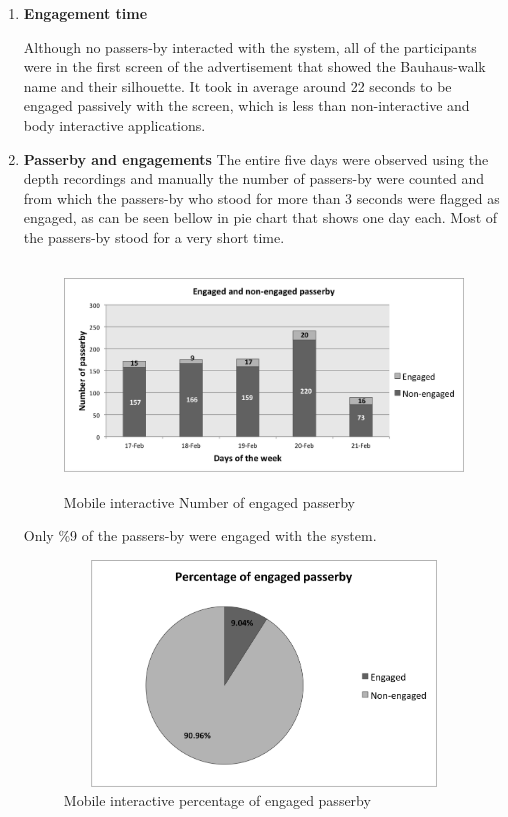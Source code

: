 \begin{enumerate}
\item \textbf{Engagement time}

Although no passers-by interacted with the system, all of the participants were in the first screen of the advertisement that showed the Bauhaus-walk name and their silhouette. It took in average around 22 seconds to be engaged passively with the screen, which is less than non-interactive and body interactive applications. 


\item \textbf{Passerby and engagements}
The entire five days were observed using the depth recordings and manually the number of passers-by were counted and from which the passers-by who stood for more than 3 seconds were flagged as engaged, as can be seen bellow in pie chart that shows one day each. Most of the passers-by stood for a very short time. 

\begin{figure}[H]
    \centering
    \includegraphics[width=110mm,height=60mm]{Figures/8/mobile_inter_findings/mobile_inter_engage_day}
    \caption{Mobile interactive Number of engaged passerby}%
    \label{fig:mobileengagedandengagedby}%
\end{figure}

Only \%9 of the passers-by were engaged with the system.


\begin{figure}[H]
    \centering
    \includegraphics[width=110mm,height=60mm]{Figures/8/mobile_inter_findings/mobile_eng_percentage}
    \caption{Mobile interactive percentage of engaged passerby}%
    \label{fig:mobileengagedpasserbypercentage}%
\end{figure}



\end{enumerate}

